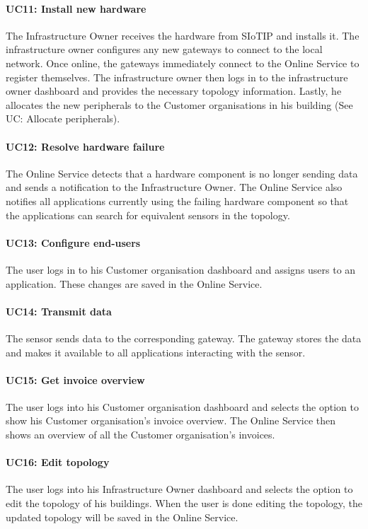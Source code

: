 \paragraph{UC11: Install new hardware}
The Infrastructure Owner receives the hardware from SIoTIP and installs it. The infrastructure owner configures any new gateways to connect to the local network. Once online, the gateways immediately connect to the Online Service to register themselves. The infrastructure owner then logs in to the infrastructure owner dashboard and provides the necessary topology information. Lastly, he allocates the new peripherals to the Customer organisations in his building (See UC: Allocate peripherals).

\paragraph{UC12: Resolve hardware failure}
The Online Service detects that a hardware component is no longer sending data and sends a notification to the Infrastructure Owner. The Online Service also notifies all applications currently using the failing hardware component so that the applications can search for equivalent sensors in the topology. 

\paragraph{UC13: Configure end-users}
The user logs in to his Customer organisation dashboard and assigns users to an application. These changes are saved in the Online Service.

\paragraph{UC14: Transmit data}
The sensor sends data to the corresponding gateway. The gateway stores the data and makes it available to all applications interacting with the sensor.

\paragraph{UC15: Get invoice overview}
The user logs into his Customer organisation dashboard and selects the option to show his Customer organisation's invoice overview. The Online Service then shows an overview of all the Customer organisation's invoices.

\paragraph{UC16: Edit topology}
The user logs into his Infrastructure Owner dashboard and selects the option to edit the topology of his buildings. When the user is done editing the topology, the updated topology will be saved in the Online Service.

